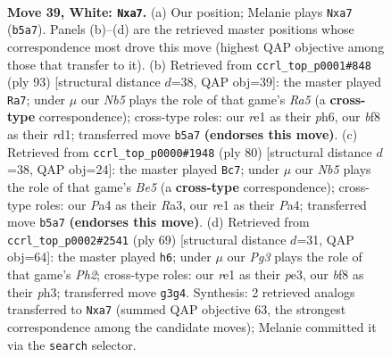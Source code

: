 \documentclass[11pt]{article}
\begin{document}
\clearpage

\begin{figure}[p]\centering
\begin{subfigure}{0.46\textwidth}\centering
\resizebox{\linewidth}{!}{%
\newchessgame
\chessboard[
  setfen={5b2/pp5k/6p1/1N3p1p/P7/6P1/RPr2PKP/4r3 w - - 0 39},
  showmover=false,
  pgfstyle=straightmove, color=movearrow, markmove={b5-a7}
]}
\caption{}
\end{subfigure}\hfill
\begin{subfigure}{0.46\textwidth}\centering
\resizebox{\linewidth}{!}{%
\newchessgame
\chessboard[
  setfen={3r4/8/1R1pk2P/2p2p2/r1P1p3/6P1/5PK1/3R4 b - - 0 47},
  showmover=false,
  pgfstyle=straightmove, color=movearrow, markmove={a4-a7}
]}
\caption{}
\end{subfigure}
\\[4pt]
\begin{subfigure}{0.46\textwidth}\centering
\resizebox{\linewidth}{!}{%
\newchessgame
\chessboard[
  setfen={6k1/1p5p/6p1/p3B3/P1p1P1bP/R5P1/3r1PK1/8 w - - 5 41},
  showmover=false,
  pgfstyle=straightmove, color=movearrow, markmove={e5-c7}
]}
\caption{}
\end{subfigure}\hfill
\begin{subfigure}{0.46\textwidth}\centering
\resizebox{\linewidth}{!}{%
\newchessgame
\chessboard[
  setfen={1r3k2/5ppp/1p1P1n2/1Rp5/6P1/4P2P/5PB1/6K1 b - - 0 35},
  showmover=false,
  pgfstyle=straightmove, color=movearrow, markmove={h7-h6}
]}
\caption{}
\end{subfigure}
\caption{\textbf{Move 39, White: \texttt{Nxa7}.} (a) Our position; Melanie plays \texttt{Nxa7} (\texttt{b5a7}). Panels (b)--(d) are the retrieved master positions whose correspondence most drove this move (highest QAP objective among those that transfer to it). (b) Retrieved from \texttt{ccrl\_top\_p0001\#848} (ply 93) [structural distance $d$=38, QAP obj=39]: the master played \texttt{Ra7}; under $\mu$ our \emph{Nb5} plays the role of that game's \emph{Ra5} (a \textbf{cross-type} correspondence); cross-type roles: our \emph{r}e1 as their \emph{p}h6, our \emph{b}f8 as their \emph{r}d1; transferred move \texttt{b5a7} \textbf{(endorses this move)}. (c) Retrieved from \texttt{ccrl\_top\_p0000\#1948} (ply 80) [structural distance $d$=38, QAP obj=24]: the master played \texttt{Bc7}; under $\mu$ our \emph{Nb5} plays the role of that game's \emph{Be5} (a \textbf{cross-type} correspondence); cross-type roles: our \emph{P}a4 as their \emph{R}a3, our \emph{r}e1 as their \emph{P}a4; transferred move \texttt{b5a7} \textbf{(endorses this move)}. (d) Retrieved from \texttt{ccrl\_top\_p0002\#2541} (ply 69) [structural distance $d$=31, QAP obj=64]: the master played \texttt{h6}; under $\mu$ our \emph{Pg3} plays the role of that game's \emph{Ph2}; cross-type roles: our \emph{r}e1 as their \emph{p}e3, our \emph{b}f8 as their \emph{p}h3; transferred move \texttt{g3g4}. Synthesis: 2 retrieved analogs transferred to \texttt{Nxa7} (summed QAP objective 63, the strongest correspondence among the candidate moves); Melanie committed it via the \texttt{search} selector.}
\label{fig:thought-m76}
\end{figure}
\end{document}
